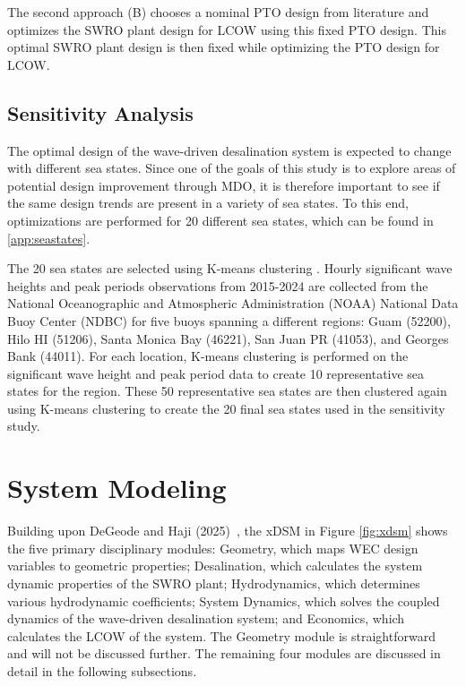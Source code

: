 \documentclass[a4paper,12pt]{elsarticle}
\begin{document}
The second approach (B) chooses a nominal PTO design from literature \cite{Yu2018} and optimizes the SWRO plant design for LCOW using this fixed PTO design. This optimal SWRO plant design is then fixed while optimizing the PTO design for LCOW.

\subsection{Sensitivity Analysis} \label{sec:sensitivity}
The optimal design of the wave-driven desalination system is expected to change with different sea states. Since one of the goals of this study is to explore areas of potential design improvement through MDO, it is therefore important to see if the same design trends are present in a variety of sea states. To this end, optimizations are performed for 20 different sea states, which can be found in \ref{app:seastates}.

The 20 sea states are selected using K-means clustering \cite{Arthur2007}. Hourly significant wave heights and peak periods observations from 2015-2024 are collected from the National Oceanographic and Atmospheric Administration (NOAA) National Data Buoy Center (NDBC) \cite{ndbc} for five buoys spanning a different regions: Guam (52200), Hilo HI (51206), Santa Monica Bay (46221), San Juan PR (41053), and Georges Bank (44011). For each location, K-means clustering is performed on the significant wave height and peak period data to create 10 representative sea states for the region. These 50 representative sea states are then clustered again using K-means clustering to create the 20 final sea states used in the sensitivity study.

\section{System Modeling} \label{sec:model}
Building upon DeGeode and Haji (2025)~\cite{idetc2025}, the xDSM in Figure \ref{fig:xdsm} shows the five primary disciplinary modules: Geometry, which maps WEC design variables to geometric properties; Desalination, which calculates the system dynamic properties of the SWRO plant; Hydrodynamics, which determines various hydrodynamic coefficients; System Dynamics, which solves the coupled dynamics of the wave-driven desalination system; and Economics, which calculates the LCOW of the system. The Geometry module is straightforward and will not be discussed further. The remaining four modules are discussed in detail in the following subsections.
\end{document}
